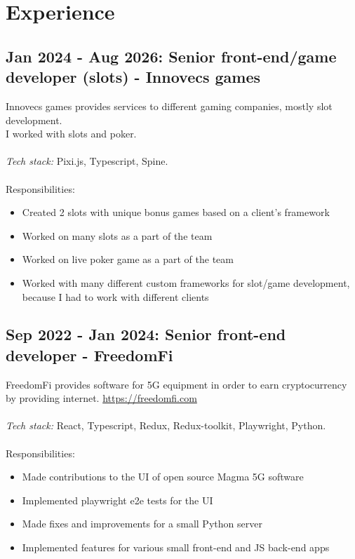 \documentclass[a4paper, 14pt]{article}
\begin{document}
\section{Experience}
  \subsection{Jan 2024 - Aug 2026: Senior front-end/game developer (slots) - Innovecs games}
    Innovecs games provides services to different gaming companies, mostly slot development. \\
    I worked with slots and poker. \\
    \\
    \textit{Tech stack:} Pixi.js, Typescript, Spine. \\
    \\
    Responsibilities:
      \begin{itemize}
        \item Created 2 slots with unique bonus games based on a client's framework \\
        \item Worked on many slots as a part of the team \\
        \item Worked on live poker game as a part of the team \\
        \item Worked with many different custom frameworks for slot/game development, because I had to work with different clients
      \end{itemize}

  \subsection{Sep 2022 - Jan 2024: Senior front-end developer - FreedomFi}

  FreedomFi provides software for 5G equipment in order to earn cryptocurrency by providing internet. \url{https://freedomfi.com} \\
  \\
  \textit{Tech stack:} React, Typescript, Redux, Redux-toolkit, Playwright, Python. \\
  \\
  Responsibilities:
    \begin{itemize}
      \item Made contributions to the UI of open source Magma 5G software \\
      \item Implemented playwright e2e tests for the UI \\
      \item Made fixes and improvements for a small Python server \\
      \item Implemented features for various small front-end and JS back-end apps
    \end{itemize}
\end{document}
